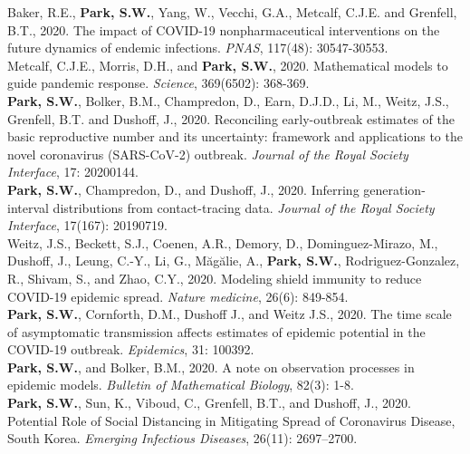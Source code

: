 \documentclass[11pt]{article} %
\begin{document}
 Baker, R.E., \textbf{Park, S.W.}, Yang, W., Vecchi, G.A., Metcalf, C.J.E. and Grenfell, B.T., 2020. The impact of COVID-19 nonpharmaceutical interventions on the future dynamics of endemic infections. \textit{PNAS}, 117(48): 30547-30553.\\

 Metcalf, C.J.E., Morris, D.H., and \textbf{Park, S.W.}, 2020. Mathematical models to guide pandemic response. \textit{Science}, 369(6502): 368-369.\\

 \textbf{Park, S.W.}, Bolker, B.M., Champredon, D., Earn, D.J.D., Li, M., Weitz, J.S., Grenfell, B.T. and Dushoff, J., 2020. Reconciling early-outbreak estimates of the basic reproductive number and its uncertainty: framework and applications to the novel coronavirus (SARS-CoV-2) outbreak. \textit{Journal of the Royal Society Interface}, 17: 20200144.\\

 \textbf{Park, S.W.}, Champredon, D., and Dushoff, J., 2020. Inferring generation-interval distributions from contact-tracing data. \textit{Journal of the Royal Society Interface}, 17(167): 20190719.\\

 Weitz, J.S., Beckett, S.J., Coenen, A.R., Demory, D., Dominguez-Mirazo, M., Dushoff, J., Leung, C.-Y., Li, G., Măgălie, A., \textbf{Park, S.W.}, Rodriguez-Gonzalez, R., Shivam, S., and Zhao, C.Y., 2020. Modeling shield immunity to reduce COVID-19 epidemic spread. \textit{Nature medicine}, 26(6): 849-854.\\

 \textbf{Park, S.W.}, Cornforth, D.M., Dushoff J., and Weitz J.S., 2020. The time scale of asymptomatic transmission affects estimates of epidemic potential in the COVID-19 outbreak. \textit{Epidemics}, 31: 100392.\\

 \textbf{Park, S.W.}, and Bolker, B.M., 2020. A note on observation processes in epidemic models. \textit{Bulletin of Mathematical Biology}, 82(3): 1-8.\\

 \textbf{Park, S.W.}, Sun, K., Viboud, C., Grenfell, B.T., and Dushoff, J., 2020. Potential Role of Social Distancing in Mitigating Spread of Coronavirus Disease, South Korea. \textit{Emerging Infectious Diseases}, 26(11): 2697–2700.\\
\end{document}
